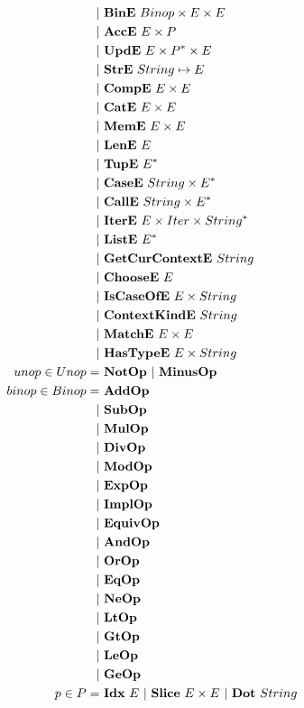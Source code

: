 \begin{align*}
    | & ~ \bine ~ Binop \times E \times E \\
    | & ~ \acce ~ E \times P \\
    | & ~ \upde ~ E \times \seq P \times E \\
    | & ~ \stre ~ String \mapsto E \\
    | & ~ \compe ~ E \times E \\
    | & ~ \cate ~ E \times E \\
    | & ~ \meme ~ E \times E \\
    | & ~ \lene ~ E \\
    | & ~ \tupe ~ \seq E \\
    | & ~ \casee ~ String \times \seq E \\
    | & ~ \calle ~ String \times \seq E \\
    | & ~ \itere ~ E \times Iter \times \seq{String} \\
    | & ~ \liste ~ \seq E \\
    | & ~ \getcurcontexte ~ String \\
    | & ~ \choosee ~ E \\
    | & ~ \iscaseofe ~ E \times String \\
    | & ~ \contextkinde ~ String \\
    | & ~ \matche ~ E \times E \\
    | & ~ \hastypee ~ E \times String \\
%
  unop \in Unop =& ~ \notop ~ | ~ \minusop \\
  binop \in Binop =& ~ \addop \\
    | & ~ \subop \\
    | & ~ \mulop \\
    | & ~ \divop \\
    | & ~ \modop \\
    | & ~ \expop \\
    | & ~ \implop \\
    | & ~ \equivop \\
    | & ~ \andop \\
    | & ~ \orop \\
    | & ~ \eqop \\
    | & ~ \neop \\
    | & ~ \ltop \\
    | & ~ \gtop \\
    | & ~ \leop \\
    | & ~ \geop \\
%
  p \in P =& ~ \idxp ~ E ~ | ~ \slicep ~ E \times E ~ | ~ \dotp ~ String \\

\end{align*}
